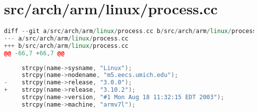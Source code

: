 \section{src/arch/arm/linux/process.cc}
\begin{lstlisting}[language=C++]
diff --git a/src/arch/arm/linux/process.cc b/src/arch/arm/linux/process.cc
--- a/src/arch/arm/linux/process.cc
+++ b/src/arch/arm/linux/process.cc
@@ -66,7 +66,7 @@
 
     strcpy(name->sysname, "Linux");
     strcpy(name->nodename, "m5.eecs.umich.edu");
-    strcpy(name->release, "3.0.0");
+    strcpy(name->release, "3.10.2");
     strcpy(name->version, "#1 Mon Aug 18 11:32:15 EDT 2003");
     strcpy(name->machine, "armv7l");
\end{lstlisting}
